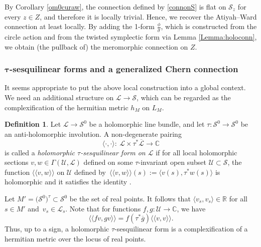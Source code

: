 \documentclass[pdftex]{sigma}
\numberwithin{equation}{section}
\theoremstyle{definition}
\newtheorem{Definition}[Theorem]{Definition}
\newcommand\C{{\mathbb C}}
\begin{document}
By Corollary \ref{om0curaw}, the connection defined by \eqref{connonS} is flat on $\mathcal
S_z$ for every $z \in Z$, and therefore it is locally trivial. Hence, we recover the Atiyah--Ward
connection at least locally. By adding the 1-form $\frac{\phi}{\widehat\sigma}$, which is
constructed from the circle action and from the twisted symplectic form via Lemma
\ref{Lemma:holoconn}, we obtain (the pullback of) the meromorphic connection on $Z$.

\subsubsection[tau-sesquilinear forms and a generalized Chern connection]{$\boldsymbol{\tau}$-sesquilinear forms and a generalized Chern connection}

It seems appropriate to put the above local construction into a global context.
We need an additional structure on $\mathcal L \longrightarrow \mathcal S$, which can
be regarded as the complexification of the hermitian metric $h_M$ on $L_M$.

\begin{Definition}
Let $\mathcal L \longrightarrow \mathcal S^0$ be a holomorphic line bundle, and
let $\tau \colon \mathcal S^0 \longrightarrow \mathcal S^0$ be an anti-holomorphic involution.
A non-degenerate pairing
\[ \langle\cdot, \cdot\rangle \colon \ \mathcal L\times \tau^*\overline{\mathcal L} \longrightarrow \C\]
is called a \emph{holomorphic $\tau$-sesquilinear form on $\mathcal L$} if for all
local holomorphic sections $v, w \in \Gamma(\mathcal U, \mathcal L)$ defined on some
$\tau$-invariant open subset
$\mathcal U \subset \mathcal S$, the function $\langle\langle v, w\rangle\rangle$ on
$\mathcal U$ defined by~${\langle\langle v, w\rangle\rangle (s) := \langle v(s), \tau^*w(s)\rangle}$
is holomorphic and it satisfies the identity
.
\end{Definition}

Let $M' = \bigl({\mathcal S}^0\bigr)^\tau \subset {\mathcal S}^0$ be the set of real points.
It follows that $\langle v_s, v_s\rangle \in {\mathbb R}$ for all $s \in M'$ and~$v_s \in {\mathcal L}_s$.
Note that for functions $f, g \colon \mathcal U \longrightarrow \C$, we have
\[\langle\langle f v, g v\rangle\rangle = f (\tau^*\overline{g}) \langle\langle v, v\rangle\rangle.\]
Thus, up to a sign, a holomorphic $\tau$-sesquilinear form is a complexification of a
hermitian metric over the locus of real points.
\end{document}
